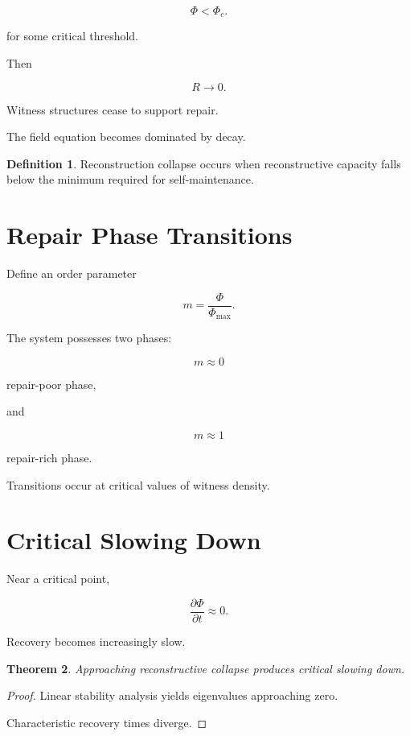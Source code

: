 \documentclass[12pt,oneside]{book}
\theoremstyle{plain} \newtheorem{theorem}{Theorem}[chapter] \newtheorem{lemma}[theorem]{Lemma} \newtheorem{proposition}[theorem]{Proposition} \newtheorem{corollary}[theorem]{Corollary}
\theoremstyle{definition} \newtheorem{definition}[theorem]{Definition} \newtheorem{axiom}[theorem]{Axiom} \newtheorem{construction}[theorem]{Construction}
\theoremstyle{remark} \newtheorem{remark}[theorem]{Remark} \newtheorem{example}[theorem]{Example}
\begin{document}
\[
\Phi
<
\Phi_c.
\]

for some critical threshold.

Then

\[
R
\rightarrow
0.
\]

Witness structures cease to support repair.

The field equation becomes dominated by decay.

\begin{definition}

Reconstruction collapse occurs when reconstructive capacity falls below the minimum required for self-maintenance.

\end{definition}

\section{Repair Phase Transitions}

Define an order parameter

\[
m
=
\frac{\Phi}{\Phi_{\max}}.
\]

The system possesses two phases:

\[
m\approx 0
\]

repair-poor phase,

and

\[
m\approx 1
\]

repair-rich phase.

Transitions occur at critical values of witness density.

\section{Critical Slowing Down}

Near a critical point,

\[
\frac{\partial\Phi}{\partial t}
\approx 0.
\]

Recovery becomes increasingly slow.

\begin{theorem}

Approaching reconstructive collapse produces critical slowing down.

\end{theorem}

\begin{proof}

Linear stability analysis yields eigenvalues approaching zero.

Characteristic recovery times diverge.

\end{proof}
\end{document}

